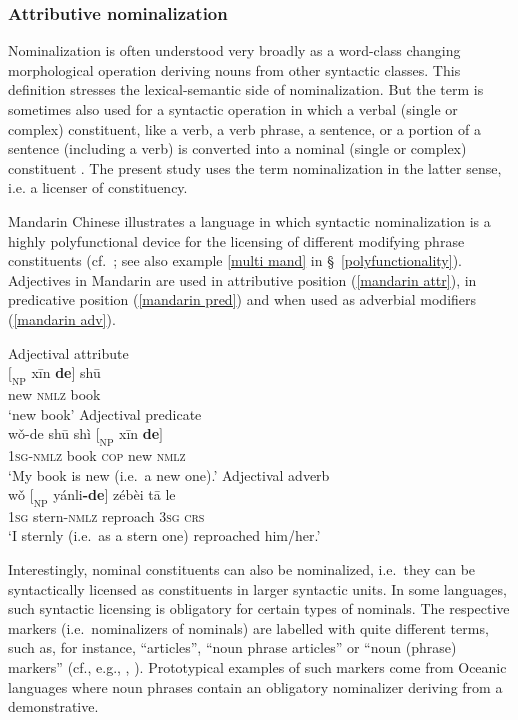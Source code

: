 \subsubsection{Attributive nominalization} \label{attr nmlz}
Nominalization is often understood very broadly as a word-class changing morphological operation deriving nouns from other syntactic classes. This definition stresses the lexical-semantic side of nominalization. But the term is sometimes also used for a syntactic operation in which a verbal (single or complex) constituent, like a verb, a verb phrase, a sentence, or a portion of a sentence (including a verb) is converted into a nominal (single or complex) constituent \citep[575]{li-etal1981}. The present study uses the term nominalization in the latter sense, i.e. a licenser of constituency.

Mandarin Chinese illustrates a language in which syntactic nominalization is a highly polyfunctional device for the licensing of different modifying phrase constituents (cf.~\citealt[575–593]{li-etal1981}; see also example \ref{multi mand} in \S~\ref{polyfunctionality}). Adjectives in Mandarin are used in attributive position (\ref{mandarin attr}), in predicative position (\ref{mandarin pred}) and when used as adverbial modifiers (\ref{mandarin adv}).%
\begin{exe}
\ex
{}
\begin{xlist}
\ex	\rm{Adjectival attribute}\\
\gll	$[_\textrm{NP}$ xīn 		\textbf{de}$]$ 	shū\\
	{} new	 	\textsc{nmlz} 	book\\
\glt	‘new book’\label{mandarin attr}
\ex	\rm{Adjectival predicate}\\
\gll	wǒ-de shū shì $[_\textrm{NP}$ xīn \textbf{de}$]$\\
	\textsc{1sg-nmlz} book \textsc{cop} {} new \textsc{nmlz}\\
\glt	‘My book is new (i.e.~a new one).’\label{mandarin pred}
\ex	\rm{Adjectival adverb}\\
\gll	wǒ $[_\textrm{NP}$ yánli\textbf{-de}$]$ zébèi tā le\\
	\textsc{1sg} {} stern\textsc{-nmlz} reproach \textsc{3sg} \textsc{crs}\\
\glt	‘I sternly (i.e.~as a stern one) reproached him/her.’ \label{mandarin adv}
\end{xlist}
\end{exe}
Interestingly, nominal constituents can also be nominalized, i.e.~they can be syntactically licensed as constituents in larger syntactic units. In some languages, such syntactic licensing is obligatory for certain types of nominals. The respective markers (i.e.~nominalizers of nominals) are labelled with quite different terms, such as, for instance, “articles”, “noun phrase articles” or “noun (phrase) markers” (cf., e.g., \citealt[152]{dryer2007}, \citealt[95, elsewhere]{rijkhoff2002}). Prototypical examples of such markers come from Oceanic languages where noun phrases contain an obligatory nominalizer deriving from a demonstrative. 


